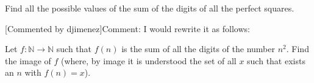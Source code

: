 Find all the possible values of the sum of the digits of all the perfect squares.

[Commented by djimenez]Comment: I would rewrite it as follows:

Let $f: \mathbb{N}\rightarrow \mathbb{N}$ such that $f(n)$ is the sum of all the digits  of the number $n^2$. Find the image of $f$ (where, by image it is understood the set of all $x$ such that exists an $n$ with $f(n)=x$).